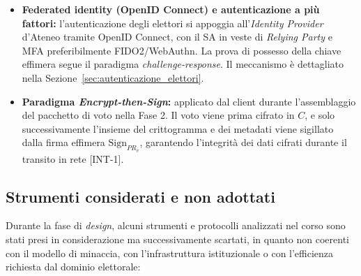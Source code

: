 \begin{itemize}
    \item \textbf{Federated identity (OpenID Connect) e autenticazione a più fattori:} l'autenticazione degli elettori si appoggia all'\textit{Identity Provider} d'Ateneo tramite OpenID Connect, con il SA in veste di \textit{Relying Party} e MFA preferibilmente FIDO2/WebAuthn. La prova di possesso della chiave effimera segue il paradigma \textit{challenge-response}. Il meccanismo è dettagliato nella Sezione~\ref{sec:autenticazione_elettori}.
    \item \textbf{Paradigma \textit{Encrypt-then-Sign}:} applicato dal client durante l'assemblaggio del pacchetto di voto nella Fase 2. Il voto viene prima cifrato in $C$, e solo successivamente l'insieme del crittogramma e dei metadati viene sigillato dalla firma effimera $\text{Sign}_{PR_v}$, garantendo l'integrità dei dati cifrati durante il transito in rete [INT-1].
\end{itemize}

\subsection{Strumenti considerati e non adottati}
\label{subsec:wp2_strumenti_non_adottati}

Durante la fase di \textit{design}, alcuni strumenti e protocolli analizzati nel corso sono stati presi in considerazione ma successivamente scartati, in quanto non coerenti con il modello di minaccia, con l'infrastruttura istituzionale o con l'efficienza richiesta dal dominio elettorale:

